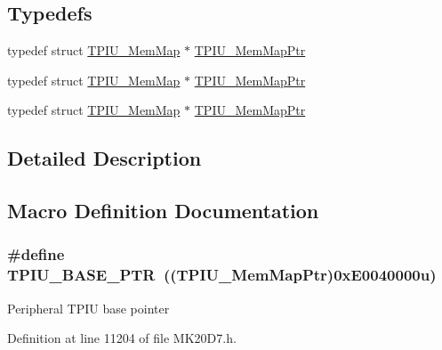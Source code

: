 \subsection*{Typedefs}
\begin{DoxyCompactItemize}
\item 
typedef struct \hyperlink{struct_t_p_i_u___mem_map}{T\+P\+I\+U\+\_\+\+Mem\+Map} $\ast$ \hyperlink{group___t_p_i_u___peripheral_ga300f3eea21a542970734e2c9c0953f4f}{T\+P\+I\+U\+\_\+\+Mem\+Map\+Ptr}
\item 
typedef struct \hyperlink{struct_t_p_i_u___mem_map}{T\+P\+I\+U\+\_\+\+Mem\+Map} $\ast$ \hyperlink{group___t_p_i_u___peripheral_ga300f3eea21a542970734e2c9c0953f4f}{T\+P\+I\+U\+\_\+\+Mem\+Map\+Ptr}
\item 
typedef struct \hyperlink{struct_t_p_i_u___mem_map}{T\+P\+I\+U\+\_\+\+Mem\+Map} $\ast$ \hyperlink{group___t_p_i_u___peripheral_ga300f3eea21a542970734e2c9c0953f4f}{T\+P\+I\+U\+\_\+\+Mem\+Map\+Ptr}
\end{DoxyCompactItemize}


\subsection{Detailed Description}


\subsection{Macro Definition Documentation}
\subsubsection[{\texorpdfstring{T\+P\+I\+U\+\_\+\+B\+A\+S\+E\+\_\+\+P\+TR}{TPIU_BASE_PTR}}]{\setlength{\rightskip}{0pt plus 5cm}\#define T\+P\+I\+U\+\_\+\+B\+A\+S\+E\+\_\+\+P\+TR~(({\bf T\+P\+I\+U\+\_\+\+Mem\+Map\+Ptr})0x\+E0040000u)}\hypertarget{group___t_p_i_u___peripheral_ga9294dc3ec1881014ac83408db60de6a0}{}\label{group___t_p_i_u___peripheral_ga9294dc3ec1881014ac83408db60de6a0}
Peripheral T\+P\+IU base pointer 

Definition at line 11204 of file M\+K20\+D7.\+h.

